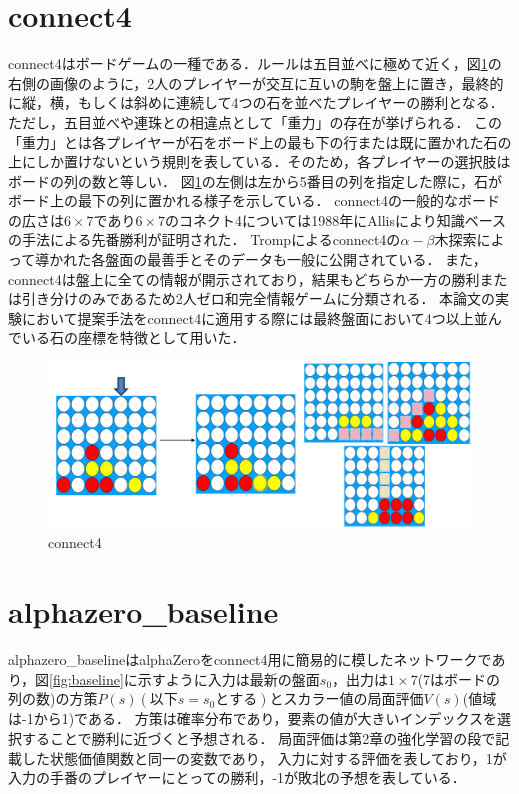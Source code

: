 \section{connect4}
connect4はボードゲームの一種である．ルールは五目並べに極めて近く，図\ref{fig:connect4}の右側の画像のように，2人のプレイヤーが交互に互いの駒を盤上に置き，最終的に縦，横，もしくは斜めに連続して4つの石を並べたプレイヤーの勝利となる．ただし，五目並べや連珠との相違点として「重力」の存在が挙げられる．
この「重力」とは各プレイヤーが石をボード上の最も下の行または既に置かれた石の上にしか置けないという規則を表している．そのため，各プレイヤーの選択肢はボードの列の数と等しい．
図\ref{fig:connect4}の左側は左から5番目の列を指定した際に，石がボード上の最下の列に置かれる様子を示している．
connect4の一般的なボードの広さは$6\times7$であり$6\times7$のコネクト4については1988年にAllis\cite{allis}により知識ベースの手法による先番勝利が証明された．
Tromp\cite{data}によるconnect4の$\alpha-\beta$木探索によって導かれた各盤面の最善手とそのデータも一般に公開されている．
また，connect4は盤上に全ての情報が開示されており，結果もどちらか一方の勝利または引き分けのみであるため2人ゼロ和完全情報ゲーム\cite{gairon}に分類される．
本論文の実験において提案手法をconnect4に適用する際には最終盤面において4つ以上並んでいる石の座標を特徴として用いた．
\begin{figure}[htbp]
	\centering
    \includegraphics[width=\linewidth]{./figure/connect4.png}
	\caption{connect4}
	\label{fig:connect4}
\end{figure}
\section{alphazero\_baseline}
alphazero\_baselineはalphaZeroをconnect4用に簡易的に模したネットワークであり，図\ref{fig:baseline}に示すように入力は最新の盤面$s_0$，出力は$1\times7$(7はボードの列の数)の方策$P(s)(以下s=s_0とする)$とスカラー値の局面評価$V(s)$(値域は-1から1)である．
方策は確率分布であり，要素の値が大きいインデックスを選択することで勝利に近づくと予想される．
局面評価は第2章の強化学習の段で記載した状態価値関数と同一の変数であり，
入力に対する評価を表しており，1が入力の手番のプレイヤーにとっての勝利，-1が敗北の予想を表している．


